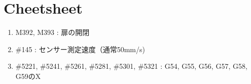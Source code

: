 \section{Cheetsheet}
\begin{enumerate}
\item M392, M393 : 扉の開閉
\item \#145 : センサー測定速度（通常50mm/s)
\item \#5221, \#5241, \#5261, \#5281, \#5301, \#5321 : G54, G55, G56, G57, G58, G59のX
\end{enumerate}














